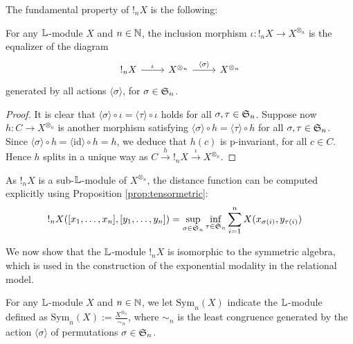 The fundamental property of $!_{n}X$ is the following:
\begin{proposition}
For any $\mathbb{L}$-module $X$ and $n\in \mathbb{N}$, the inclusion morphism 
$\iota:!_{n}X\longrightarrow X^{\otimes_{n}}$ is the equalizer of the diagram
$$
\begin{tikzcd}
!_{n}X \ar{r}{\iota} & X^{\otimes_{n}} \ar{r}{\langle \sigma\rangle} & X^{\otimes_{n}}
\end{tikzcd}
$$
generated by all actions $\langle \sigma\rangle$, for $\sigma\in \mathfrak{S}_{n}$.
\end{proposition}
\begin{proof}
It is clear that $\langle \sigma \rangle \circ \iota= \langle \tau\rangle \circ \iota$ holds for all $\sigma, \tau \in \mathfrak{S}_{n}$.
Suppose now $h: C\to X^{\otimes_{n}}$ is another morphism satisfying
$\langle \sigma \rangle \circ h= \langle \tau\rangle \circ h$ for all $\sigma, \tau \in \mathfrak{S}_{n}$.
Since $\langle \sigma \rangle \circ h= \langle \mathrm{id}\rangle \circ h=h$, we deduce that $h(c)$ is p-invariant, for all $c\in C$. Hence $h$ splits in a unique way as $C \stackrel{h}{\to} !_{n}X \stackrel{\iota}{\to} X^{\otimes_{n}}$.
\end{proof}

\begin{remark}
As $!_{n}X$ is a sub-$\mathbb{L}$-module of $X^{\otimes_{n}}$, the distance function can be computed explicitly using Proposition \ref{prop:tensormetric}:
\begin{align*}
!_{n}X( [x_{1},\dots, x_{n}], [y_{1},\dots, y_{n}]) & = 
\sup_{\sigma\in \mathfrak{S}_{n}}\inf_{\tau\in \mathfrak{S}_{n}}
\sum_{i=1}^{n}
X(x_{\sigma(i)},y_{\tau(i)})
\end{align*}
\end{remark}


We now show that the $\mathbb{L}$-module $!_{n}X$ is isomorphic to the symmetric algebra, which is used in the construction of the exponential modality in the relational model.

\begin{definition}
For any $\mathbb{L}$-module $X$ and $n\in \mathbb{N}$, we let $\mathrm{Sym}_{n}(X)$ indicate the $\mathbb{L}$-module defined as 
$\mathrm{Sym}_{n}(X):=\frac{X^{\otimes_{n}}}{\sim_{n}}
$, where $\sim_{n}$ is the least congruence generated by the action $\langle \sigma\rangle$ of permutations $\sigma\in \mathfrak{S}_{n}$.\end{definition}


